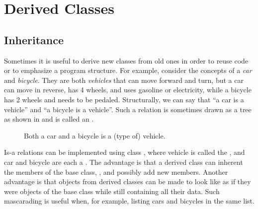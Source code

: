 \chapter{Derived Classes}
\label{chap:derivedClasses}
\section{Inheritance}
\label{sec:inheritance}
Sometimes it is useful to derive new classes from old ones in order to reuse code or to emphasize a program structure. For example, consider the concepts of a \emph{car} and \emph{bicycle}. They are both \emph{vehicles} that can move forward and turn, but a car can move in reverse, has 4 wheels, and uses gasoline or electricity, while a bicycle has 2 wheels and needs to be pedaled. Structurally, we can say that ``a car is a vehicle'' and ``a bicycle is a vehicle''. Such a relation is sometimes drawn as a tree as shown in  and is called an .
%
\begin{figure}
  \centering
  \caption{Both a car and a bicycle is a (type of) vehicle.}
  \label{fig:inheritanceVehicle}
\end{figure}
%
Is-a relations can be implemented using class , where vehicle is called the , and car and bicycle are each a . The advantage is that a derived class can inherent the members of the base class, , and possibly add new members. Another advantage is that objects from derived classes can be made to look like as if they were objects of the base class while still containing all their data. Such mascarading is useful when, for example, listing cars and bicycles in the same list.

